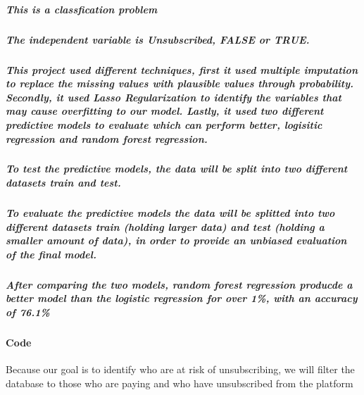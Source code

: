 \documentclass[]{article}
\let\oldparagraph\paragraph
\renewcommand{\paragraph}[1]{\oldparagraph{#1}\mbox{}}
\let\oldsubparagraph\subparagraph
\renewcommand{\subparagraph}[1]{\oldsubparagraph{#1}\mbox{}}
\begin{document}
\subparagraph{This is a classfication
problem}\label{this-is-a-classfication-problem}

\subparagraph{The independent variable is Unsubscribed, FALSE or
TRUE.}\label{the-independent-variable-is-unsubscribed-false-or-true.}

\subparagraph{This project used different techniques, first it used
multiple imputation to replace the missing values with plausible values
through probability. Secondly, it used Lasso Regularization to identify
the variables that may cause overfitting to our model. Lastly, it used
two different predictive models to evaluate which can perform better,
logisitic regression and random forest
regression.}\label{this-project-used-different-techniques-first-it-used-multiple-imputation-to-replace-the-missing-values-with-plausible-values-through-probability.-secondly-it-used-lasso-regularization-to-identify-the-variables-that-may-cause-overfitting-to-our-model.-lastly-it-used-two-different-predictive-models-to-evaluate-which-can-perform-better-logisitic-regression-and-random-forest-regression.}

\subparagraph{To test the predictive models, the data will be split into
two different datasets train and
test.}\label{to-test-the-predictive-models-the-data-will-be-split-into-two-different-datasets-train-and-test.}

\subparagraph{To evaluate the predictive models the data will be
splitted into two different datasets train (holding larger data) and
test (holding a smaller amount of data), in order to provide an unbiased
evaluation of the final
model.}\label{to-evaluate-the-predictive-models-the-data-will-be-splitted-into-two-different-datasets-train-holding-larger-data-and-test-holding-a-smaller-amount-of-data-in-order-to-provide-an-unbiased-evaluation-of-the-final-model.}

\subparagraph{After comparing the two models, random forest regression
producde a better model than the logistic regression for over 1\%, with
an accuracy of
76.1\%}\label{after-comparing-the-two-models-random-forest-regression-producde-a-better-model-than-the-logistic-regression-for-over-1-with-an-accuracy-of-76.1}

\paragraph{Code}\label{code}

Because our goal is to identify who are at risk of unsubscribing, we
will filter the database to those who are paying and who have
unsubscribed from the platform
\end{document}
